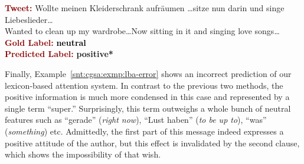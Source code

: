 \begin{example}\label{snt:cgsa:exmp:baziotis-error}
  \noindent\textup{\bfseries\textcolor{darkred}{Tweet:}} {\upshape \colorbox{white!1.4}{Wollte} \colorbox{blue!7.7}{meinen} \colorbox{white!3.6}{Kleiderschrank} \colorbox{blue!1.7}{aufr\"aumen} \ldots \colorbox{white!1.2}{sitze} \colorbox{green!4.6}{nun} \colorbox{green!31.5}{darin} \colorbox{green!2.8}{und} \colorbox{green!29.7}{singe} \colorbox{green!15.2}{Liebeslieder}\ldots}\\
  \noindent \colorbox{white!1.4}{Wanted} to \colorbox{blue!1.7}{clean up} \colorbox{blue!7.7}{my} \colorbox{white!3.6}{wardrobe}\ldots \colorbox{green!4.6}{Now} \colorbox{white!1.2}{sitting} \colorbox{green!31.5}{in it} \colorbox{green!2.8}{and} \colorbox{green!29.7}{singing} \colorbox{green!15.2}{love songs}\ldots\\[\exampleSep]
  \noindent\textup{\bfseries\textcolor{darkred}{Gold Label:}}\hspace*{4.3em}\textbf{%
    \upshape\textcolor{black}{neutral}}\\
 \noindent\textup{\bfseries\textcolor{darkred}{Predicted Label:}}\hspace*{2em}\textbf{%
    \upshape\textcolor{green3}{positive*}}
\end{example}

Finally, Example~\ref{snt:cgsa:exmp:lba-error} shows an incorrect
prediction of our lexicon-based attention system.  In contrast to the
previous two methods, the positive information is much more condensed
in this case and represented by a single term ``super.''
Surprisingly, this term outweighs a whole bunch of neutral features
such as ``gerade'' (\emph{right now}), ``Lust haben'' (\emph{to be up
  to}), ``was'' (\emph{something}) etc.  Admittedly, the first part of
this message indeed expresses a positive attitude of the author, but
this effect is invalidated by the second clause, which shows the
impossibility of that wish.

